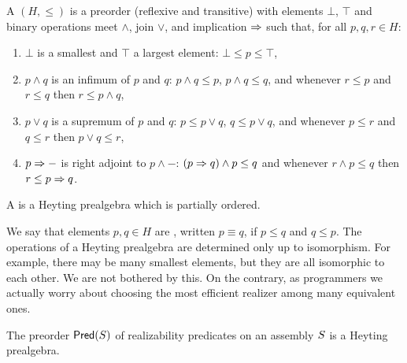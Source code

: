 \begin{definition}
  A  $(H, {\leq})$ is a preorder (reflexive
  and transitive) with elements $\bot$, $\top$ and binary operations
  meet $\land$, join $\lor$, and implication $\Rightarrow$ such that, for all
  $p, q, r \in H$:
  \begin{enumerate}
  \item $\bot$ is a smallest and $\top$ a largest element: $\bot \leq
    p \leq \top$,
  \item $p \land q$ is an infimum of $p$ and $q$: $p \land q \leq p$,
    $p \land q \leq q$, and whenever $r \leq p$ and $r \leq q$ then $r
    \leq p \land q$,
  \item $p \lor q$ is a supremum of $p$ and $q$: $p \leq p \lor q$, $q
    \leq p \lor q$, and whenever $p \leq r$ and $q \leq r$ then $p
    \lor q \leq r$,
  \item $p \Rightarrow {-}$ is right adjoint to $p \land {-}$: $(p \Rightarrow q)
    \land p \leq q$ and whenever $r \land p \leq q$ then $r \leq p
    \Rightarrow q$.
  \end{enumerate}
  A  is a Heyting prealgebra which is partially
  ordered.
\end{definition}

We say that elements $p, q \in H$ are , written $p
\equiv q$, if $p \leq q$ and $q \leq p$. The operations of a Heyting
prealgebra are determined only up to isomorphism. For example, there
may be many smallest elements, but they are all isomorphic to each
other. We are not bothered by this. On the contrary, as programmers we
actually worry about choosing the most efficient realizer among many
equivalent ones.

\begin{proposition}
  The preorder $\mathsf{Pred}(S)$ of realizability predicates on an
  assembly $S$ is a Heyting prealgebra.
\end{proposition}


